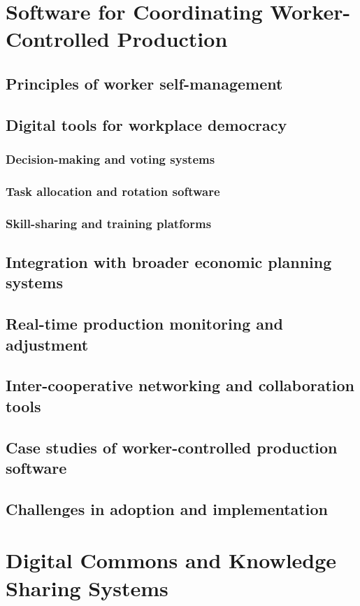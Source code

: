 \newpage

\section{Software for Coordinating Worker-Controlled Production}
\subsection{Principles of worker self-management}
\subsection{Digital tools for workplace democracy}
\subsubsection{Decision-making and voting systems}
\subsubsection{Task allocation and rotation software}
\subsubsection{Skill-sharing and training platforms}
\subsection{Integration with broader economic planning systems}
\subsection{Real-time production monitoring and adjustment}
\subsection{Inter-cooperative networking and collaboration tools}
\subsection{Case studies of worker-controlled production software}
\subsection{Challenges in adoption and implementation}

\newpage

\section{Digital Commons and Knowledge Sharing Systems}
